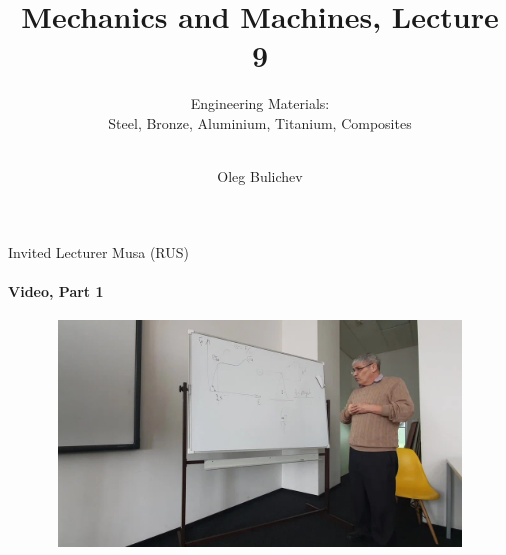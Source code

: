 \documentclass[aspectratio=169]{beamer}
\title[MaM]{Mechanics and Machines, Lecture 9} %
\subtitle{Engineering Materials:  
\\ Steel, Bronze, Aluminium, Titanium, Composites  \\   
\ } %
\author{Oleg Bulichev}
\newcommand{\fbckg}[1]{\usebackgroundtemplate{\texttt{[image: \#1]}}}%
\begin{document}
\setlength{\abovedisplayskip}{0pt}
\setlength{\belowdisplayskip}{0pt}
\setlength{\abovedisplayshortskip}{0pt}
\setlength{\belowdisplayshortskip}{0pt}

\fbckg{fibeamer/figs/title_page.png}

\fbckg{fibeamer/figs/common.png}

\note{\scriptsize \begin{itemize}
        \item \
    \end{itemize}}

    \begin{frame}[t]{Invited Lecturer Musa (RUS)}
        \framesubtitle{Video, Part 1}
        \vspace{-0.6cm}
        \begin{figure}[H]
            \href{https://disk.yandex.ru/i/pmZGYsEMQlrWTA}{
                \centering\includegraphics[height=6cm,width=1\textwidth,keepaspectratio]{musa_lec_1_video.png}}
            \label{fig:musa_lec_1_video.png}
        \end{figure}
    \end{frame}
    
\end{document}
